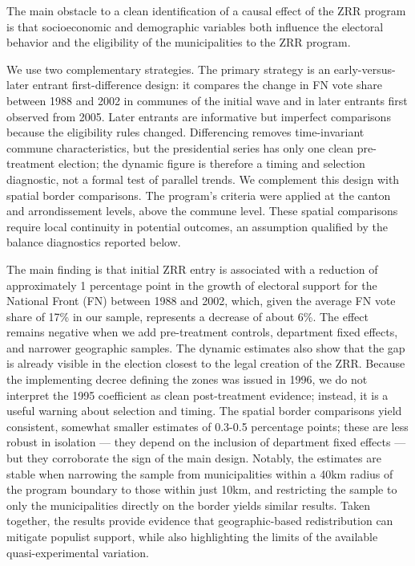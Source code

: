 The main obstacle to a clean identification of a causal effect of the ZRR program is that socioeconomic and demographic variables both influence the electoral behavior and the eligibility of the municipalities to the ZRR program. 

We use two complementary strategies. The primary strategy is an early-versus-later entrant first-difference design: it compares the change in FN vote share between 1988 and 2002 in communes of the initial wave and in later entrants first observed from 2005. Later entrants are informative but imperfect comparisons because the eligibility rules changed. Differencing removes time-invariant commune characteristics, but the presidential series has only one clean pre-treatment election; the dynamic figure is therefore a timing and selection diagnostic, not a formal test of parallel trends. We complement this design with spatial border comparisons. The program's criteria were applied at the canton and arrondissement levels, above the commune level. These spatial comparisons require local continuity in potential outcomes, an assumption qualified by the balance diagnostics reported below.

The main finding is that initial ZRR entry is associated with a reduction of approximately 1 percentage point in the growth of electoral support for the National Front (FN) between 1988 and 2002, which, given the average FN vote share of 17\% in our sample, represents a decrease of about 6\%. The effect remains negative when we add pre-treatment controls, department fixed effects, and narrower geographic samples. The dynamic estimates also show that the gap is already visible in the election closest to the legal creation of the ZRR. Because the implementing decree defining the zones was issued in 1996, we do not interpret the 1995 coefficient as clean post-treatment evidence; instead, it is a useful warning about selection and timing. The spatial border comparisons yield consistent, somewhat smaller estimates of 0.3-0.5 percentage points; these are less robust in isolation --- they depend on the inclusion of department fixed effects --- but they corroborate the sign of the main design. Notably, the estimates are stable when narrowing the sample from municipalities within a 40km radius of the program boundary to those within just 10km, and restricting the sample to only the municipalities directly on the border yields similar results. Taken together, the results provide evidence that geographic-based redistribution can mitigate populist support, while also highlighting the limits of the available quasi-experimental variation.

